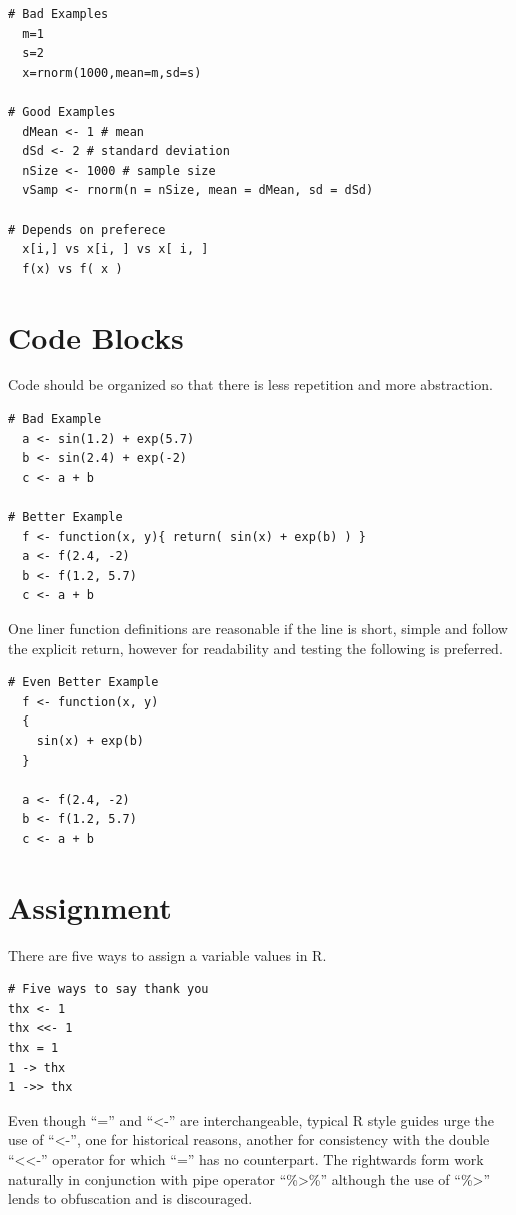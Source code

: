 \documentclass[
]{book}
\begin{document}
\begin{verbatim}
# Bad Examples
  m=1
  s=2
  x=rnorm(1000,mean=m,sd=s)

# Good Examples
  dMean <- 1 # mean
  dSd <- 2 # standard deviation
  nSize <- 1000 # sample size
  vSamp <- rnorm(n = nSize, mean = dMean, sd = dSd)

# Depends on preferece
  x[i,] vs x[i, ] vs x[ i, ]
  f(x) vs f( x )
\end{verbatim}

\hypertarget{code-blocks}{%
\section{Code Blocks}\label{code-blocks}}

Code should be organized so that there is less repetition and more abstraction.

\begin{verbatim}
# Bad Example
  a <- sin(1.2) + exp(5.7)
  b <- sin(2.4) + exp(-2)
  c <- a + b

# Better Example
  f <- function(x, y){ return( sin(x) + exp(b) ) }
  a <- f(2.4, -2)
  b <- f(1.2, 5.7)
  c <- a + b
\end{verbatim}

One liner function definitions are reasonable if the line is short, simple and follow the explicit return, however for readability and testing the following is preferred.

\begin{verbatim}
# Even Better Example
  f <- function(x, y)
  {
    sin(x) + exp(b)
  }
  
  a <- f(2.4, -2)
  b <- f(1.2, 5.7)
  c <- a + b
\end{verbatim}

\hypertarget{assignment}{%
\section{Assignment}\label{assignment}}

There are five ways to assign a variable values in R.

\begin{verbatim}
# Five ways to say thank you
thx <- 1
thx <<- 1
thx = 1
1 -> thx
1 ->> thx
\end{verbatim}

Even though ``='' and ``\textless-'' are interchangeable, typical R style guides
urge the use of ``\textless-'', one for historical reasons, another for
consistency with the double ``\textless\textless-'' operator for which ``='' has no
counterpart. The rightwards form work naturally in conjunction with
pipe operator ``\%\textgreater\%'' although the use of ``\%\textgreater{}'' lends to obfuscation and
is discouraged.
\end{document}
